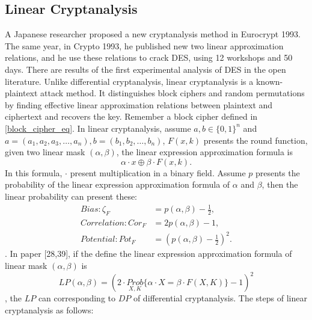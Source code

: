 \subsection{Linear Cryptanalysis}
A Japanese researcher \cite{matsui1993linear} proposed a new cryptanalysis method in Eurocrypt 1993. The same year, in Crypto 1993, he published new two linear approximation relations, and he use these relations to crack DES, using 12 workshops and 50 days. There are results of the first experimental analysis of DES in the open literature. Unlike differential cryptanalysis, linear cryptanalysis is a known-plaintext attack method. It distinguishes block ciphers and random permutations by finding effective linear approximation relations between plaintext and ciphertext and recovers the key. Remember a block cipher defined in \ref{block_cipher_eq}. In linear cryptanalysis, assume $a,b\in \{0,1\}^n$ and $a=(a_1,a_2,a_3,…,a_n), b=(b_1,b_2,…,b_n)$, $F(x,k)$ presents the round function,  given two linear mask $(\alpha,\beta)$, the linear expression approximation formula is
\begin{equation}
\alpha \cdot x \oplus \beta \cdot F(x,k).
\end{equation} 
In this formula, $\cdot$ present multiplication in a binary field. Assume $p$ presents the probability of the linear expression approximation formula of $\alpha$ and $\beta$, then the linear probability can present these:
\begin{equation}
\begin{aligned}
Bias: \zeta_F &= p(\alpha,\beta) - \frac{1}{2},\\
Correlation: Cor_F &= 2p(\alpha, \beta) -1,\\
Potential: Pot_F &= (p(\alpha, \beta)-\frac{1}{2})^2.
\end{aligned}
\end{equation}. In paper [28,39], if the define the linear expression approximation formula of  linear mask $(\alpha,\beta)$ is
\begin{equation}
LP(\alpha,\beta) = (2\cdot \underset{X,K}{Prob}\{\alpha \cdot X=\beta \cdot F(X,K)\}-1)^2
\end{equation}, the $LP$ can corresponding to $DP$ of differential cryptanalysis. The steps of linear cryptanalysis as follows:
